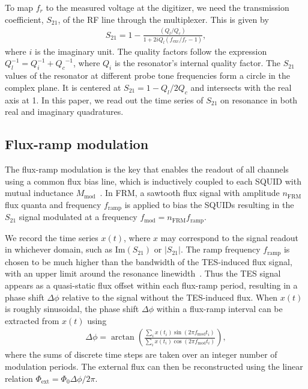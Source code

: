 \documentclass[
 prd,
 reprint,
 superscriptaddress,
 amsmath,amssymb,
 aps,
 floatfix,
]{revtex4-2}
\begin{document}
To map $f_r$ to the measured voltage at the digitizer, we need the transmission coefficient, $S_{21}$, of the RF line through the multiplexer. This is given by
\begin{gather} \label{eq:S_21}
    S_{21} = 1- \frac{(Q_l/Q_c)}{1+2iQ_l(f_{\text{exc}}/f_r-1)},
\end{gather}
where $i$ is the imaginary unit. The quality factors follow the expression $Q_l^{-1} = Q_i^{-1} + {Q_c}^{-1}$, where $Q_i$ is the resonator's internal quality factor. The $S_{21}$ values of the resonator at different probe tone frequencies form a circle in the complex plane. It is centered at $S_{21} = 1-Q_l/2Q_c$ and intersects with the real axis at 1. In this paper, we read out the time series of $S_{21}$ on resonance in both real and imaginary quadratures.

\subsection{Flux-ramp modulation}
\label{model:FRM}
The flux-ramp modulation is the key that enables the readout of all channels using a common flux bias line, which is inductively coupled to each SQUID with mutual inductance $M_\text{mod}$~\cite{mates_flux-ramp_2012}. In FRM, a sawtooth flux signal with amplitude $n_{\text{FRM}}$ flux quanta and frequency $f_{\mathrm{ramp}}$ is applied to bias the SQUIDs resulting in the $S_{21}$ signal modulated at a frequency \mbox{$f_{\mathrm{mod}} = n_{\text{FRM}} f_{\mathrm{ramp}}$}.

We record the time series $x(t)$, where $x$ may correspond to the signal readout in whichever domain, such as $\mathrm{Im}(S_{21})$ or $|S_{21}|$. The ramp frequency $f_{\mathrm{ramp}}$ is chosen to be much higher than the bandwidth of the TES-induced flux signal, with an upper limit around the resonance linewidth~\cite{yu_bandwidth_2022}. Thus the TES signal appears as a quasi-static flux offset within each flux-ramp period, resulting in a phase shift $\Delta \phi$ relative to the signal without the TES-induced flux. When $x(t)$ is roughly sinusoidal, the phase shift $\Delta\phi$ within a flux-ramp interval can be extracted from $x(t)$ using
\begin{gather}
    \Delta\phi = \arctan \left( \frac{\sum_i x(t_i) \sin(2\pi f_{\mathrm{mod}} t_i)}{\sum_i x(t_i) \cos(2\pi f_{\mathrm{mod}} t_i)} \right),
\end{gather}
where the sums of discrete time steps are taken over an integer number of modulation periods. The external flux can then be reconstructed using the linear relation $\Phi_{\mathrm{ext}} = \Phi_0 \Delta\phi / 2\pi$.
\end{document}
